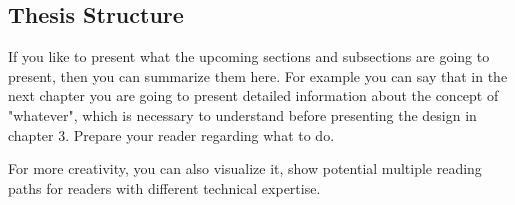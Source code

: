 \subsection{Thesis Structure}
If you like to present what the upcoming sections and subsections are  going to present, then you can summarize them here. For example you can say that in the next chapter you are going to present detailed  information about the concept of "whatever", which is necessary to understand before presenting the design in chapter 3. Prepare your reader regarding what to do. 

For more creativity, you can also visualize it, show potential multiple reading paths for readers with different technical expertise. 
